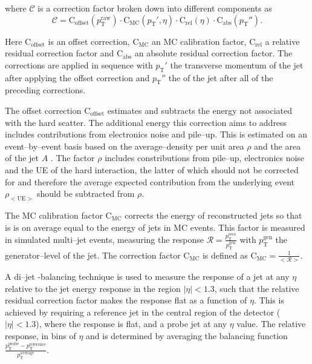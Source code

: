 where $\mathcal{C}$ is a correction factor broken down into different
components as \cite{cms-jec-2011}
\begin{equation}\label{eqn:objects_jec_corrfac}
\mathcal{C} = \text{C}_{\text{offset}}(p_{\text{T}}^{\text{raw}})\cdot
\text{C}_{\text{MC}}(p_{\text{T}}',\eta)\cdot \text{C}_{\text{rel}}(\eta)
\cdot \text{C}_{\text{abs}}(p_{\text{T}}'').
\end{equation}

Here $\text{C}_{\text{offset}}$ is an offset correction, $\text{C}_{\text{MC}}$ an
\ac{MC} calibration factor, $\text{C}_{\text{rel}}$ a relative residual correction
factor and $\text{C}_{\text{abs}}$ an absolute residual correction factor. The corrections
are applied in sequence with $p_{\text{T}}'$ the transverse momentum 
of the jet after applying the offset correction and $p_{\text{T}}''$ the \pT of the
jet after all of the preceding corrections.

The offset correction $\text{C}_{\text{offset}}$ estimates and subtracts the energy
not associated with the hard scatter. The additional energy this correction
aims to address includes contributions from electronics noise and pile--up. This is
estimated on an event--by--event basis based on the average--\pT density
per unit area $\rho$ and the area of the jet $A$ \cite{jet-area}. The factor $\rho$ includes
constributions from pile--up, electronics noise and the \ac{UE} of the hard interaction, the 
latter of which should not be corrected for and therefore the average expected contribution
from the underlying event $\rho_{<\text{UE}>}$ should be subtracted from $\rho$.

The \ac{MC} calibration factor $\text{C}_{\text{MC}}$ corrects the energy of reconstructed
jets so that is is on average equal to the energy of jets in \ac{MC} events. This
factor is measured in simulated multi--jet events, measuring the response $\mathcal{R} = \frac{p_{\text{T}}^{\text{reco}}}{p_{\text{T}}^{\text{gen}}}$
with $p_{\text{T}}^{\text{gen}}$ the generator--level \pT of the jet. The correction
factor $\text{C}_{\text{MC}}$ is defined as $\text{C}_{\text{MC}} = \frac{1}{<\mathcal{R}>}$.

A di--jet \pT-balancing technique \cite{cms-jec-2011}
is used to measure the response of a jet at any $\eta$ relative
to the jet energy response in the region $|\eta|<1.3$, such that 
the relative residual correction factor makes the response flat
as a function of $\eta$. This is achieved by requiring a reference jet
in the central region of the detector ($|\eta|<1.3$), where
the response is flat, and a probe jet at any 
$\eta$ value. The relative response, in bins of $\eta$ and \pT  is determined by
averaging the balancing function $\frac{p_{\text{T}}^{\text{probe}} - p_{\text{T}}^{\text{reference}}}{p_{\text{T}}^{\text{average}}}$.

